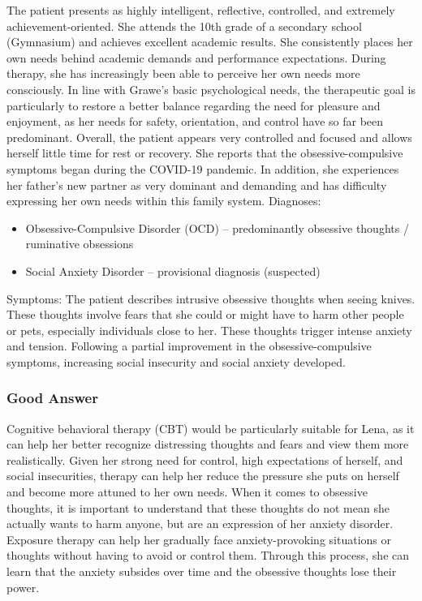 \documentclass[sigconf,natbib=false]{acmart}
\begin{document}
The patient presents as highly intelligent, reflective, controlled, and extremely achievement-oriented.
She attends the 10th grade of a secondary school (Gymnasium) and achieves excellent academic results.
She consistently places her own needs behind academic demands and performance expectations.
During therapy, she has increasingly been able to perceive her own needs more consciously.
In line with Grawe’s basic psychological needs, the therapeutic goal is particularly to restore a better balance regarding the need for pleasure and enjoyment, as her needs for safety, orientation, and control have so far been predominant.
Overall, the patient appears very controlled and focused and allows herself little time for rest or recovery.
She reports that the obsessive-compulsive symptoms began during the COVID-19 pandemic.
In addition, she experiences her father’s new partner as very dominant and demanding and has difficulty expressing her own needs within this family system.
Diagnoses:
\begin{itemize}
\item Obsessive-Compulsive Disorder (OCD) – predominantly obsessive thoughts / ruminative obsessions
\item Social Anxiety Disorder – provisional diagnosis (suspected)
\end{itemize}
Symptoms: The patient describes intrusive obsessive thoughts when seeing knives.
These thoughts involve fears that she could or might have to harm other people or pets, especially individuals close to her.
These thoughts trigger intense anxiety and tension.
Following a partial improvement in the obsessive-compulsive symptoms, increasing social insecurity and social anxiety developed.
\subsubsection{Good Answer}
Cognitive behavioral therapy (CBT) would be particularly suitable for Lena, as it can help her better recognize distressing thoughts and fears and view them more realistically.
Given her strong need for control, high expectations of herself, and social insecurities, therapy can help her reduce the pressure she puts on herself and become more attuned to her own needs.
When it comes to obsessive thoughts, it is important to understand that these thoughts do not mean she actually wants to harm anyone, but are an expression of her anxiety disorder.
Exposure therapy can help her gradually face anxiety-provoking situations or thoughts without having to avoid or control them.
Through this process, she can learn that the anxiety subsides over time and the obsessive thoughts lose their power.
\end{document}
